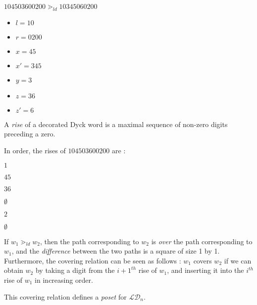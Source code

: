 \begin{example}[$n = 5$]
    $104503600200 \gtrdot_{ld} 10345060200$
    \begin{itemize}
        \item $l = 10$
        \item $r = 0200$
        \item $x = 45$
        \item $x' = 345$
        \item $y = 3$
        \item $z = 36$
        \item $z' = 6$
    \end{itemize}
    
\end{example}

\begin{definition}[Rise]
    A \emph{rise} of a decorated Dyck word is a maximal
    sequence of non-zero digits preceding a zero.
\end{definition}

\begin{example}[$n = 5$]
    In order, the rises of $104503600200$ are :\\
    \begin{itemize*}
        \item $1$
        \item $45$
        \item $36$
        \item $\emptyset$
        \item $2$
        \item $\emptyset$
    \end{itemize*}
\end{example}

\begin{rem}
    If $w_1 \gtrdot_{ld} w_2$, then the path corresponding to
    $w_2$ is \emph{over} the path corresponding to $w_1$,
    and the \emph{difference} between the two paths is a
    square of size 1 by 1.\\
    Furthermore, the covering relation can be seen as follows :
    $w_1$ covers $w_2$ if we can obtain $w_2$ by taking a
    digit from the $i + 1^{th}$ rise of $w_1$, and inserting it
    into the $i^{th}$ rise of $w_1$ in increasing order.
\end{rem}

\begin{prop}
    This covering relation defines a \emph{poset}
    for $\mathcal{LD}_n$.
\end{prop}

